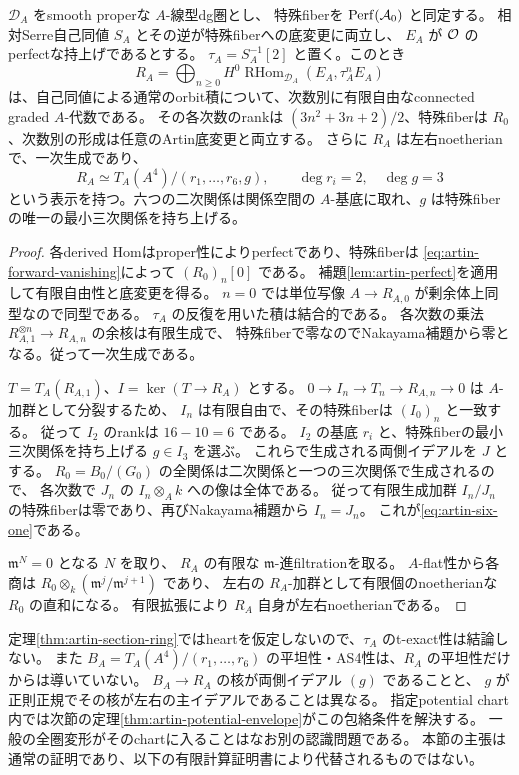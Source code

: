 \begin{theorem}[全Artin底での反標準環の平坦な有限表示]\label{thm:artin-section-ring}
$\mathcal D_A$ をsmooth properな $A$-線型dg圏とし、
特殊fiberを $\operatorname{Perf}(\mathcal A_0)$ と同定する。
相対Serre自己同値 $S_A$ とその逆が特殊fiberへの底変更に両立し、
$E_A$ が $\mathcal O$ のperfectな持上げであるとする。
$\tau_A=S_A^{-1}[2]$ と置く。このとき
\[
 R_A=\bigoplus_{n\ge0}H^0\operatorname{RHom}_{\mathcal D_A}(E_A,\tau_A^n E_A)
\]
は、自己同値による通常のorbit積について、次数別に有限自由なconnected graded $A$-代数である。
その各次数のrankは $(3n^2+3n+2)/2$、特殊fiberは $R_0$、次数別の形成は任意のArtin底変更と両立する。
さらに $R_A$ は左右noetherianで、一次生成であり、
\begin{equation}\label{eq:artin-six-one}
 R_A\simeq T_A(A^4)/(r_1,\ldots,r_6,g),\qquad \deg r_i=2,\quad\deg g=3
\end{equation}
という表示を持つ。六つの二次関係は関係空間の $A$-基底に取れ、$g$ は特殊fiberの唯一の最小三次関係を持ち上げる。
\end{theorem}
\begin{proof}
各derived Homはproper性によりperfectであり、特殊fiberは
\eqref{eq:artin-forward-vanishing}によって $(R_0)_n[0]$ である。
補題\ref{lem:artin-perfect}を適用して有限自由性と底変更を得る。
$n=0$ では単位写像 $A\to R_{A,0}$ が剰余体上同型なので同型である。
$\tau_A$ の反復を用いた積は結合的である。
各次数の乗法 $R_{A,1}^{\otimes n}\to R_{A,n}$ の余核は有限生成で、
特殊fiberで零なのでNakayama補題から零となる。従って一次生成である。

$T=T_A(R_{A,1})$、$I=\ker(T\to R_A)$ とする。
$0\to I_n\to T_n\to R_{A,n}\to0$ は $A$-加群として分裂するため、
$I_n$ は有限自由で、その特殊fiberは $(I_0)_n$ と一致する。
従って $I_2$ のrankは $16-10=6$ である。
$I_2$ の基底 $r_i$ と、特殊fiberの最小三次関係を持ち上げる $g\in I_3$ を選ぶ。
これらで生成される両側イデアルを $J$ とする。
$R_0=B_0/(G_0)$ の全関係は二次関係と一つの三次関係で生成されるので、
各次数で $J_n$ の $I_n\otimes_Ak$ への像は全体である。
従って有限生成加群 $I_n/J_n$ の特殊fiberは零であり、再びNakayama補題から $I_n=J_n$。
これが\eqref{eq:artin-six-one}である。

$\mathfrak m^N=0$ となる $N$ を取り、
$R_A$ の有限な $\mathfrak m$-進filtrationを取る。
$A$-flat性から各商は
$R_0\otimes_k(\mathfrak m^j/\mathfrak m^{j+1})$ であり、
左右の $R_A$-加群として有限個のnoetherianな $R_0$ の直和になる。
有限拡張により $R_A$ 自身が左右noetherianである。
\end{proof}

\begin{remark}[残っている再構成条件]\label{rem:artin-gap}
定理\ref{thm:artin-section-ring}ではheartを仮定しないので、$\tau_A$ のt-exact性は結論しない。
また $B_A=T_A(A^4)/(r_1,\ldots,r_6)$ の平坦性・AS4性は、$R_A$ の平坦性だけからは導いていない。
$B_A\to R_A$ の核が両側イデアル $(g)$ であることと、
$g$ が正則正規でその核が左右の主イデアルであることは異なる。
指定potential chart内では次節の定理\ref{thm:artin-potential-envelope}がこの包絡条件を解決する。
一般の全圏変形がそのchartに入ることはなお別の認識問題である。
本節の主張は通常の証明であり、以下の有限計算証明書により代替されるものではない。
\end{remark}


